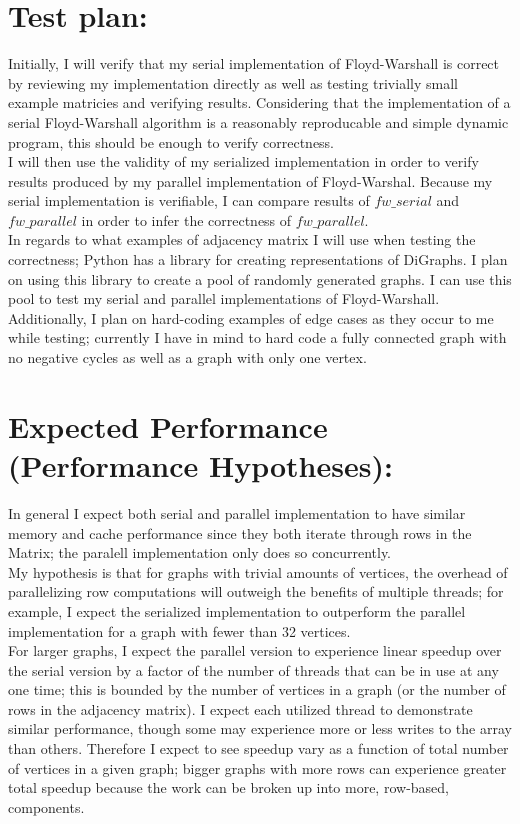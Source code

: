 \documentclass[]{article}
\begin{document}
	
	\section{Test plan:} 
	Initially, I will verify that my serial implementation of Floyd-Warshall is correct by reviewing my implementation directly as well as testing trivially small example matricies and verifying results. Considering that the implementation of a serial Floyd-Warshall algorithm is a reasonably reproducable and simple dynamic program, this should be enough to verify correctness.
	\\
	I will then use the validity of my serialized implementation in order to verify results produced by my parallel implementation of Floyd-Warshal. Because my serial implementation is verifiable, I can compare results of $fw\_serial$ and $fw\_parallel$ in order to infer the correctness of $fw\_parallel$. 
	\\
	In regards to what examples of adjacency matrix I will use when testing the correctness; Python has a library for creating representations of DiGraphs. I plan on using this library to create a pool of randomly generated graphs. I can use this pool to test my serial and parallel implementations of Floyd-Warshall. Additionally, I plan on hard-coding examples of edge cases as they occur to me while testing; currently I have in mind to hard code a fully connected graph with no negative cycles as well as a graph with only one vertex.
	
	
	\section{Expected Performance (Performance Hypotheses):} 
	In general I expect both serial and parallel implementation to have similar memory and cache performance since they both iterate through rows in the Matrix; the paralell implementation only does so concurrently.
	\\
	My hypothesis is that for graphs with trivial amounts of vertices, the overhead of parallelizing row computations will outweigh the benefits of multiple threads; for example, I expect the serialized implementation to outperform the parallel implementation for a graph with fewer than 32 vertices.
	\\
	For larger graphs, I expect the parallel version to experience linear speedup over the serial version by a factor of the number of threads that can be in use at any one time; this is bounded by the number of vertices in a graph (or the number of rows in the adjacency matrix). I expect each utilized thread to demonstrate similar performance, though some may experience more or less writes to the array than others. Therefore I expect to see speedup vary as a function of total number of vertices in a given graph; bigger graphs with more rows can experience greater total speedup because the work can be broken up into more, row-based, components.
\end{document}
